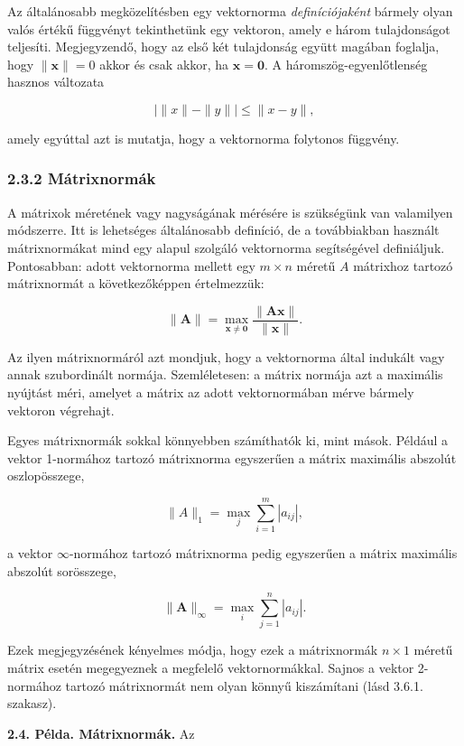 \documentclass[
  magyar,
  11pt]{article}
\providecommand{\boldsymbol}[1]{\mathbf{#1}}
\begin{document}
Az általánosabb megközelítésben egy vektornorma \emph{definíciójaként}
bármely olyan valós értékű függvényt tekinthetünk egy vektoron, amely e
három tulajdonságot teljesíti. Megjegyzendő, hogy az első két
tulajdonság együtt magában foglalja, hogy \(\|\boldsymbol{x}\| = 0\)
akkor és csak akkor, ha \(\boldsymbol{x} = \boldsymbol{0}\). A
háromszög-egyenlőtlenség hasznos változata

\[|\|x\| - \|y\|| \le \|x - y\|,\]

amely egyúttal azt is mutatja, hogy a vektornorma folytonos függvény.

\subsubsection{2.3.2 Mátrixnormák}\label{muxe1trixnormuxe1k}

A mátrixok méretének vagy nagyságának mérésére is szükségünk van
valamilyen módszerre. Itt is lehetséges általánosabb definíció, de a
továbbiakban használt mátrixnormákat mind egy alapul szolgáló
vektornorma segítségével definiáljuk. Pontosabban: adott vektornorma
mellett egy \(m \times n\) méretű \(A\) mátrixhoz tartozó mátrixnormát a
következőképpen értelmezzük:

\[\|\boldsymbol{A}\| = \max_{\boldsymbol{x} \neq \boldsymbol{0}} \frac{\|\boldsymbol{A}\boldsymbol{x}\|}{\|\boldsymbol{x}\|}.\]

Az ilyen mátrixnormáról azt mondjuk, hogy a vektornorma által indukált
vagy annak szubordinált normája. Szemléletesen: a mátrix normája azt a
maximális nyújtást méri, amelyet a mátrix az adott vektornormában mérve
bármely vektoron végrehajt.

Egyes mátrixnormák sokkal könnyebben számíthatók ki, mint mások. Például
a vektor 1-normához tartozó mátrixnorma egyszerűen a mátrix maximális
abszolút oszlopösszege,

\[\|A\|_1 = \max_j \sum_{i=1}^m |a_{ij}|,\]

a vektor \(\infty\)-normához tartozó mátrixnorma pedig egyszerűen a
mátrix maximális abszolút sorösszege,

\[\|\mathbf{A}\|_{\infty} = \max_{i} \sum_{j=1}^{n} |a_{ij}|.\]

Ezek megjegyzésének kényelmes módja, hogy ezek a mátrixnormák
\(n \times 1\) méretű mátrix esetén megegyeznek a megfelelő
vektornormákkal. Sajnos a vektor 2-normához tartozó mátrixnormát nem
olyan könnyű kiszámítani (lásd 3.6.1. szakasz).

\textbf{2.4. Példa. Mátrixnormák.} Az
\end{document}
